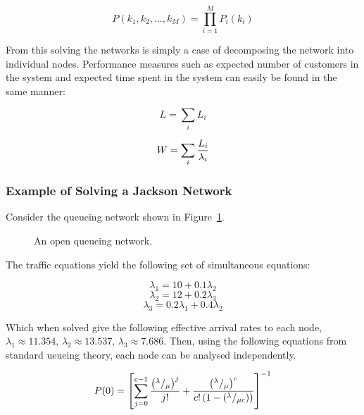 \documentclass{article}
\begin{document}
\begin{equation}
    P(k_1, k_2, \dotsc, k_M) = \prod_{i=1}^M P_i(k_i)
\end{equation}

From this solving the networks is simply a case of decomposing the network into individual nodes.
Performance measures such as expected number of customers in the system and expected time spent in the system can easily be found in the same manner:

\begin{equation}
    L = \sum_i L_i
\end{equation}

\begin{equation}
    W = \sum_i {L_i \over \lambda_i}
\end{equation}

\subsubsection{Example of Solving a Jackson Network}
Consider the queueing network shown in Figure~\ref{fig:jacksonnet}.

\begin{figure}[H]
    
    \caption{An open queueing network.}
    \label{fig:jacksonnet}
\end{figure}

The traffic equations yield the following set of simultaneous equations:

\begin{equation*}
\lambda_1 = 10 + 0.1 \lambda_2
\end{equation*}
\begin{equation*}
\lambda_2 = 12 + 0.2 \lambda_3
\end{equation*}
\begin{equation*}
\lambda_3 = 0.2 \lambda_1 + 0.4 \lambda_2
\end{equation*}

Which when solved give the following effective arrival rates to each node, $\lambda_1 \approx 11.354$, $\lambda_2 \approx 13.537$, $\lambda_3 \approx 7.686$.
Then, using the following equations from standard ueueing theory, each node can be analysed independently.

\begin{equation}
P(0) = \left[\sum_{j=0}^{c-1}{\left({^\lambda / _\mu}\right)^j\over j!}+{\left({^\lambda / _\mu}\right)^c\over c!\left(1-{\left(^\lambda / _{\mu c}\right)} \right)}\right]^{-1}
\end{equation}
\end{document}
